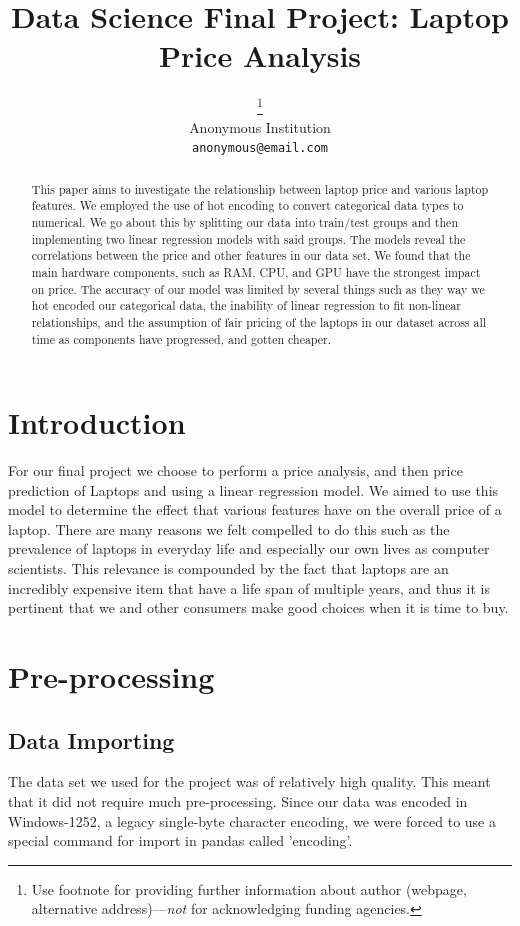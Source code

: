 \documentclass{article}
\title{Data Science Final Project: Laptop Price Analysis}
\author{ \thanks{Use footnote for providing further information
    about author (webpage, alternative address)---\emph{not} for acknowledging
    funding agencies.} \\
  Anonymous Institution\\
  \texttt{anonymous@email.com} \\
}
\begin{document}
\maketitle


\begin{abstract}
  This paper aims to investigate the relationship between laptop price and various laptop features. We employed the use of hot encoding to convert categorical data types to numerical. We go about this by splitting our data into train/test groups and then implementing two linear regression models with said groups. The models reveal the correlations between the price and other features in our data set. We found that the main hardware components, such as RAM, CPU, and GPU have the strongest impact on price. The accuracy of our model was limited by several things such as they way we hot encoded our categorical data, the inability 
  of linear regression to fit non-linear relationships, and the assumption of fair pricing of the laptops in our dataset across all time as components have progressed, and gotten cheaper. 
\end{abstract}

\section{Introduction}
For our final project we choose to perform a price analysis, and then price prediction of Laptops and using a linear regression model. We aimed to use this model to determine the effect that various features have on the overall price of a laptop. There are many reasons we felt compelled to do this such as the prevalence of laptops in everyday life and especially our own lives as computer scientists. This relevance is compounded by the fact that laptops are an incredibly expensive item that have a life span of multiple years, and thus it is pertinent that we and other consumers make good choices when it is time to buy.

\section{Pre-processing}

\subsection{Data Importing}


The data set we used for the project was of relatively high quality. This meant that it did not require much pre-processing. Since our data was encoded in Windows-1252, a legacy single-byte character encoding, we were forced to use a special command for import in pandas called 'encoding'.
\end{document}
